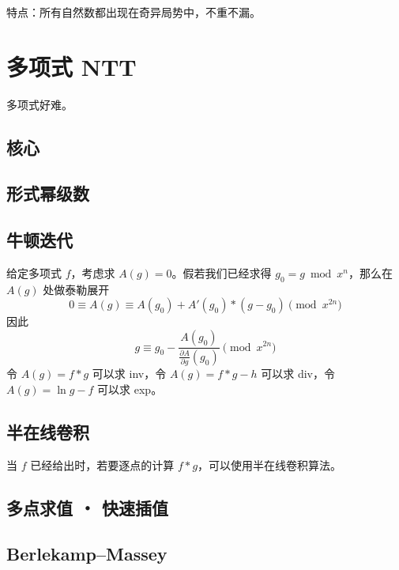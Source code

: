 \documentclass{probook}
\begin{document}
\begin{multicols}{2}
特点：所有自然数都出现在奇异局势中，不重不漏。

\section{多项式 NTT}

多项式好难。

\subsection{核心}



\subsection{形式幂级数}



\subsection{牛顿迭代}

给定多项式 $f$，考虑求 $A(g) = 0$。假若我们已经求得 $g_0 = g \bmod x^n$，那么在 $A(g)$ 处做泰勒展开
\[ 0 \equiv A(g) \equiv A(g_0) + A'(g_0) \ast (g - g_0) \pmod{x^{2n}} \]
因此
\[ g \equiv g_0 - \frac{A(g_0)}{\frac{\partial A}{\partial g}(g_0)} \pmod{x^{2n}} \]
令 $A(g) = f \ast g$ 可以求 inv，令 $A(g) = f \ast g - h$ 可以求 div，令 $A(g) = \ln g - f$ 可以求 exp。



\subsection{半在线卷积}

当 $f$ 已经给出时，若要逐点的计算 $f \ast g$，可以使用半在线卷积算法。



\subsection{多点求值 ・ 快速插值}



\subsection{Berlekamp–Massey}


\end{multicols}
\end{document}
